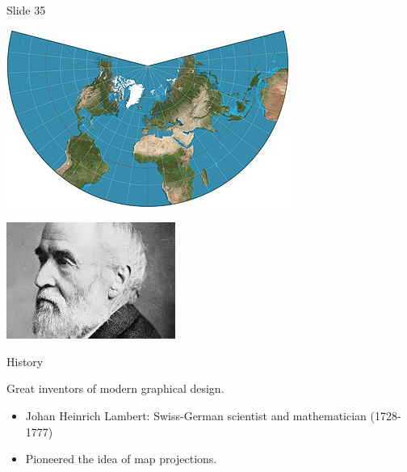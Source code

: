 \documentclass[
  ignorenonframetext,
]{beamer}
\begin{document}
\begin{frame}{Slide 35}
\protect\hypertarget{slide-35}{}
\begin{minipage}{0.45\textwidth}
\centering
\includegraphics[width=\textwidth]{excellence_figs/fig_31.png}
\end{minipage}
\hfill
\begin{minipage}{0.45\textwidth}
\centering
\includegraphics[width=\textwidth]{excellence_figs/fig_30.png}
\end{minipage}
\hfill
\begin{minipage}{0.45\textwidth}
\footnotesize
History

Great inventors of modern graphical design.

\begin{itemize}
  \item Johan Heinrich Lambert: Swiss-German scientist and mathematician (1728-1777)
  \item Pioneered the idea of map projections.
\end{itemize}
\end{minipage}
\end{frame}
\end{document}
